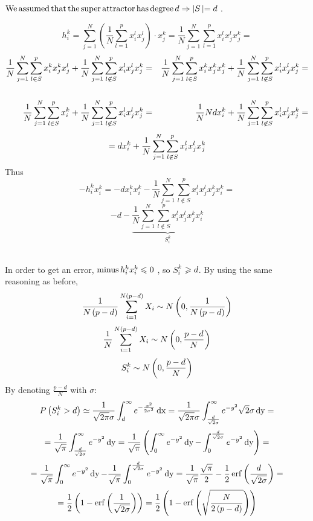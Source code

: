 $\operatorname{We} \operatorname{assumed} \operatorname{that} \operatorname{the} \operatorname{super} \operatorname{attractor}
\operatorname{has} \operatorname{degree} d    \Rightarrow \left| S
\left| = d  \right. \right.$.


\[ h_i^k = \sum^N_{j = 1} \left(^{} \frac{1}{N} \sum^p_{l = 1} x^l_{i^{}}
   x^l_j \right)_{} \cdot x_j^k = \frac{1}{N}  \sum^N_{j = 1} \sum^p_{l = 1}
   x^l_{i^{}} x^l_j x^k_{^{} j} = \]
\begin{eqnarray*}
  \frac{1}{N}  \sum^N_{j = 1} \sum_{l \in S}^p x^k_{i} x^k_j x^l_{j}   + \frac{1}{N}  \sum^N_{j = 1} \sum^p_{l \not\in S}
  x^l_{i} x^l_j x^k_{j}  & = &  \frac{1}{N}  \sum^N_{j = 1} \sum_{l
  \in S}^p x^k_{i} x^k_j x^k_{j}   + \frac{1}{N}
  \sum^N_{j = 1} \sum^p_{l \not\in S} x^l_{i} x^l_j x^k_{j} =\\
  &  & \\
  \frac{1}{N}  \sum^N_{j = 1} \sum_{l \in S}^p x^k_{i}  + 
  \frac{1}{N}  \sum^N_{j = 1} \sum^p_{l \not\in S} x^l_{i} x^l_j x^k_{j}
  & = &  \frac{1}{N} N d x^k_{i}  + \frac{1}{N}  \sum^N_{j =
  1} \sum^p_{l \not\in S} x^l_{i} x^l_j x^k_{j} =
\end{eqnarray*}
\[ = d x^k_{i^{}}  + \frac{1}{N}  \sum^N_{j = 1} \sum^p_{l \not\in S}
   x^l_{i^{}} x^l_j x^k_{^{} j} \]
Thus
\[ - h^k_i x^k_i = - d x_i^k x_i^k - \frac{1}{N}  \sum^N_{j = 1} \sum^p_{l
   \nin S} x^l_{i^{}} x^l_j x^k_{^{} j} x^k_{i^{}} = \]
\[ - d - \underbrace{ \frac{1}{N}  \sum^N_{j = 1} \sum^p_{l \nin S} x^l_{i^{}}
   x^l_j x^k_{^{} j} x^k_{i^{}} }_{S^k_i} \]
\ \ \ \ \ \ \ \ \ \ \ \ \ \ \ \ \ \ \ \ \ \ \ \ \ \ \ \ \ \ \ \ \ \ \ \ \ \ \
\ \ \ \ \ \ \ \ \ \ \ \ \ \ \ \ \ \ \ \ \ \ \

In order to get an error, $\operatorname{minus} h^k_i x^k_i \leqslant 0 $ ,
so $S^k_i$ $\geqslant d $. By using the same reasoning as before,
\[ \frac{1}{N \left( p - d \right)} \sum_{i = 1}^{N \left( p - d \right)} X_i
   \sim N \left( 0 , \frac{1}{N \left( p - d \right)} \right) \]
\[ \frac{1}{N} \sum_{i = 1}^{N \left( p - d \right)} X_i \sim N \left( 0
   , \frac{p - d}{N} \right) \]
\[ S^k_i \sim N \left( 0 , \frac{p - d}{N} \right) \]
By denoting $\frac{p - d}{N}$ with $\sigma :$
\[ P \left( S^k_i > d \right) \simeq \frac{1}{\sqrt{2 \pi} \sigma}
   \int^{\infty}_d e^{- \frac{x^2}{2 \sigma^2}} \operatorname{dx} = \frac{1}{\sqrt{2
   \pi} \sigma} \int^{\infty}_{\frac{d}{\sqrt{2} \sigma}} e^{- y^2}
   \sqrt{2} \sigma \operatorname{dy} = \]
\[ = \frac{1}{\sqrt{\pi}} \int^{\infty}_{\frac{d}{\sqrt{2} \sigma}} e^{-
   y^2} \operatorname{dy} = \frac{1}{\sqrt{\pi}} \left( \int^{\infty}_0 e^{- y^2}
   \operatorname{dy} - \int^{\frac{d}{\sqrt{2} \sigma}}_0 e^{- y^2} \operatorname{dy} \right)
   = \]
\[ = \frac{1}{\sqrt{\pi}} \int^{\infty}_0 e^{- y^2} \operatorname{dy} -
   \frac{1}{\sqrt{\pi}} \int^{\frac{d}{\sqrt{2} \sigma}}_0 e^{- y^2}
   \operatorname{dy} = \frac{1}{\sqrt{\pi}}  \frac{\sqrt{\pi}}{2}  -
   \frac{1}{2} \operatorname{erf} \left( \frac{d}{\sqrt{2 \sigma}} \right) = \]
\[ = \frac{1}{2} \left( 1   - \operatorname{erf} \left( \frac{1}{\sqrt{2
   \sigma}} \right) \right) = \frac{1}{2} \left( 1   -
   {\operatorname{erf}} \left( \sqrt{\frac{N}{2 \left( p - d \right)}}
   \right) \right)  \]


